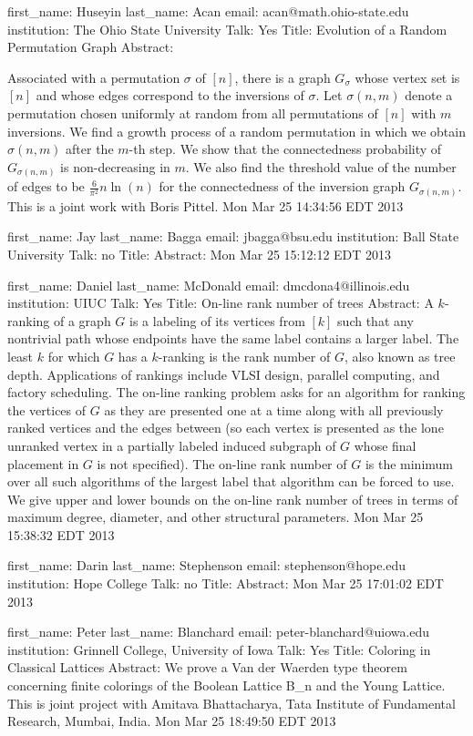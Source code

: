 \documentclass{article}
\begin{document}
first_name: Huseyin
last_name: Acan
email: acan@math.ohio-state.edu
institution: The Ohio State University
Talk: Yes
Title: Evolution of a Random Permutation Graph
Abstract:

Associated with a permutation $\sigma$ of $[n]$, there is a graph $G_{\sigma}$ whose vertex set is $[n]$ and whose edges correspond to the inversions of $\sigma$. Let $\sigma(n,m)$ denote a permutation chosen uniformly at random from all permutations of $[n]$ with $m$ inversions.  We find a growth process of a random permutation in which we obtain $\sigma(n,m)$ after the $m$-th step. We show that the connectedness probability of $G_{\sigma(n,m)}$ is non-decreasing in $m$. We also find the threshold value of the number of edges to be $\frac{6}{\pi^2}n\ln(n)$ for the connectedness of the inversion graph $G_{\sigma(n,m)}$. This is a joint work with Boris Pittel.
Mon Mar 25 14:34:56 EDT 2013

first_name: Jay
last_name: Bagga
email: jbagga@bsu.edu
institution: Ball State University
Talk: no
Title:
Abstract:
Mon Mar 25 15:12:12 EDT 2013

first_name: Daniel
last_name: McDonald
email: dmcdona4@illinois.edu
institution: UIUC
Talk: Yes
Title: On-line rank number of trees
Abstract: A $k$-ranking of a graph $G$ is a labeling of its vertices from $[k]$ such that any nontrivial path whose endpoints have the same label contains a larger label.  The least $k$ for which $G$ has a $k$-ranking is the rank number of $G$, also known as tree depth.  Applications of rankings include VLSI design, parallel computing, and factory scheduling. The on-line ranking problem asks for an algorithm for ranking the vertices of $G$ as they are presented one at a time along with all previously ranked vertices and the edges between (so each vertex is presented as the lone unranked vertex in a partially labeled induced subgraph of $G$ whose final placement in $G$ is not specified).  The on-line rank number of $G$ is the minimum over all such algorithms of the largest label that algorithm can be forced to use.  We give upper and lower bounds on the on-line rank number of trees in terms of maximum degree, diameter, and other structural parameters.
Mon Mar 25 15:38:32 EDT 2013

first_name: Darin
last_name: Stephenson
email: stephenson@hope.edu
institution: Hope College
Talk: no
Title:
Abstract:
Mon Mar 25 17:01:02 EDT 2013

first_name: Peter
last_name: Blanchard
email: peter-blanchard@uiowa.edu
institution: Grinnell College, University of Iowa
Talk: Yes
Title: Coloring in Classical Lattices
Abstract: We prove a Van der Waerden type theorem concerning finite colorings of the Boolean Lattice B_n and the Young Lattice.  This is joint project with Amitava Bhattacharya, Tata Institute of Fundamental Research, Mumbai, India.
Mon Mar 25 18:49:50 EDT 2013
\end{document}
